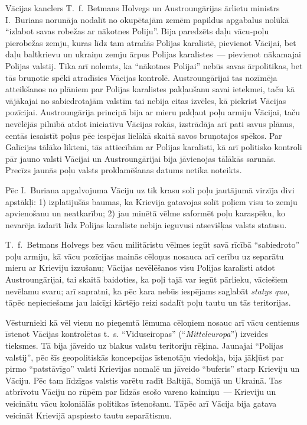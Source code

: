 \documentclass[twoside,a5paper,12pt,fleqn,openany]{extbook}
\newcommand{\detxti}[1]{\textit{\textgerman{#1}}}
\newcommand{\latxti}[1]{\textit{\textlatin{#1}}}
\begin{document}
Vācijas kanclers T.~f.~Betmans Holvegs un Austroungārijas ārlietu ministrs I.~Burians norunāja nodalīt no okupētajām zemēm papildus apgabalus nolūkā ``izlabot savas robežas ar nākotnes Poliju''. Bija paredzēts daļu vācu-poļu pierobežas zemju, kuras līdz tam atradās Polijas karalistē, pievienot Vācijai, bet daļu baltkrievu un ukraiņu zemju ārpus Polijas karalistes~--- pievienot nākamajai Polijas valstij. Tika arī nolemts, ka ``nākotnes Polijai'' nebūs savas ārpolitikas, bet tās bruņotie spēki atradīsies Vācijas kontrolē. Austroungārijai tas nozīmēja atteikšanos no plāniem par Polijas karalistes pakļaušanu savai ietekmei, taču kā vājākajai no sabiedrotajām valstīm tai nebija citas izvēles, kā piekrist Vācijas pozīcijai. Austroungārija principā bija ar mieru pakļaut poļu armiju Vācijai, taču nevēlējās pilnībā atdot iniciatīvu Vācijas rokās, izstrādāja arī pati savus plānus, centās iesaistīt poļus pēc iespējas lielākā skaitā savos bruņotajos spēkos. Par Galīcijas tālāko likteni, tās attiecībām ar Polijas karalisti, kā arī politisko kontroli pār jauno valsti Vācijai un Austroungārijai bija jāvienojas tālākās sarunās. Precīzs jaunās poļu valsts proklamēšanas datums netika noteikts.

Pēc I.~Buriana apgalvojuma Vāciju uz tik krasu soli poļu jautājumā virzīja divi apstākļi: 1) izplatījušās baumas, ka Krievija gatavojas solīt poļiem visu to zemju apvienošanu un neatkarību; 2) jau minētā vēlme saformēt poļu karaspēku, ko nevarēja izdarīt līdz Polijas karaliste nebija ieguvusi atsevišķas valsts statusu.

T.~f.~Betmans Holvegs bez vācu militāristu vēlmes iegūt savā rīcībā ``sabiedroto'' poļu armiju, kā vācu pozīcijas mainās cēloņus nosauca arī cerību uz separātu mieru ar Krieviju izzušanu; Vācijas nevēlēšanos visu Polijas karalisti atdot Austroungārijai, tai skaitā baidoties, ka poļi tajā var iegūt pārlieku, vāciešiem nevēlamu svaru; arī sapratni, ka pēc kara nebūs iespējams saglabāt \latxti{statys quo}, tāpēc nepieciešams jau laicīgi kārtējo reizi sadalīt poļu tautu un tās teritorijas.

Vēsturnieki kā vēl vienu no pieņemtā lēmuma cēloņiem nosauc arī vācu centienus īstenot Vācijas kontrolētas t.~s. ``Viduseiropas'' (``\detxti{Mitteleuropa}'') izveides tieksmes. Tā bija jāveido uz blakus valstu teritoriju rēķina. Jaunajai ``Polijas valstij'', pēc šīs ģeopolitiskās koncepcijas īstenotāju viedokļa, bija jākļūst par pirmo ``patstāvīgo'' valsti Krievijas nomalē un jāveido ``buferis'' starp Krieviju un Vāciju. Pēc tam līdzīgas valstis varētu radīt Baltijā, Somijā un Ukrainā. Tas atbrīvotu Vāciju no rūpēm par līdzās esošo vareno kaimiņu~--- Krieviju un veicinātu vācu koloniālās politikas īstenošanu. Tāpēc arī Vācija bija gatava veicināt Krievijā apspiesto tautu separātismu.
\end{document}
